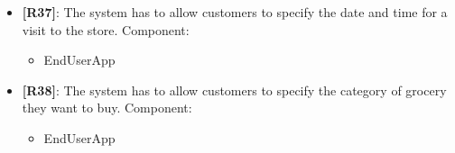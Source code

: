 \begin{itemize}
\begin{itemize}
    \end{itemize}
    \item {\textbf{[R37]}}: The system has to allow customers to specify the date and time for a visit to the store.
    Component:
    \begin{itemize}
        \item EndUserApp
    \end{itemize}
    \item {\textbf{[R38]}}: The system has to allow customers to specify the category of grocery they want to buy.
    Component:
    \begin{itemize}
        \item EndUserApp
    \end{itemize}

\end{itemize}
